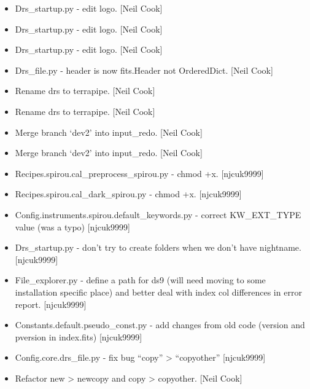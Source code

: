 \documentclass[a4paper,10pt,english]{report}
\begin{document}
\begin{itemize}
\item {} 
Drs\_startup.py - edit logo. {[}Neil Cook{]}

\item {} 
Drs\_startup.py - edit logo. {[}Neil Cook{]}

\item {} 
Drs\_startup.py - edit logo. {[}Neil Cook{]}

\item {} 
Drs\_file.py - header is now fits.Header not OrderedDict. {[}Neil Cook{]}

\item {} 
Rename drs to terrapipe. {[}Neil Cook{]}

\item {} 
Rename drs to terrapipe. {[}Neil Cook{]}

\item {} 
Merge branch ‘dev2’ into input\_redo. {[}Neil Cook{]}

\item {} 
Merge branch ‘dev2’ into input\_redo. {[}Neil Cook{]}

\item {} 
Recipes.spirou.cal\_preprocess\_spirou.py - chmod +x. {[}njcuk9999{]}

\item {} 
Recipes.spirou.cal\_dark\_spirou.py - chmod +x. {[}njcuk9999{]}

\item {} 
Config.instruments.spirou.default\_keywords.py - correct KW\_EXT\_TYPE
value (was a typo) {[}njcuk9999{]}

\item {} 
Drs\_startup.py - don’t try to create folders when we don’t have
nightname. {[}njcuk9999{]}

\item {} 
File\_explorer.py - define a path for ds9 (will need moving to some
installation specific place) and better deal with index col
differences in error report. {[}njcuk9999{]}

\item {} 
Constants.default.pseudo\_const.py - add changes from old code (version
and pversion in index.fits) {[}njcuk9999{]}

\item {} 
Config.core.drs\_file.py - fix bug “copy” \textendash{}\textgreater{} “copyother” {[}njcuk9999{]}

\item {} 
Refactor new \textendash{}\textgreater{} newcopy   and copy \textendash{}\textgreater{} copyother. {[}Neil Cook{]}


\end{itemize}
\end{document}
